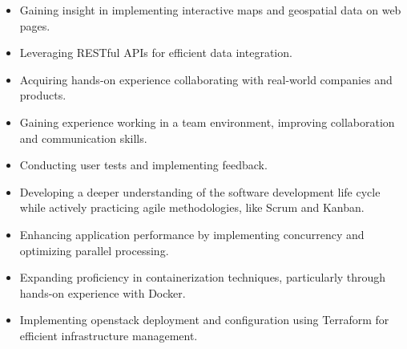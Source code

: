 \begin{itemize}
    \item Gaining insight in implementing interactive maps and geospatial data on web pages.
    \item Leveraging RESTful APIs for efficient data integration.
    \item Acquiring hands-on experience collaborating with real-world companies and products.
    \item Gaining experience working in a team environment, improving collaboration and communication skills.
    \item Conducting user tests and implementing feedback. 
    \item Developing a deeper understanding of the software development life cycle while actively practicing agile methodologies, like Scrum and Kanban.
    \item Enhancing application performance by implementing concurrency and optimizing parallel processing.
    \item Expanding proficiency in containerization techniques, particularly through hands-on experience with Docker.
    \item Implementing \Gls{openstack} deployment and configuration using Terraform for efficient infrastructure management.

\end{itemize}
